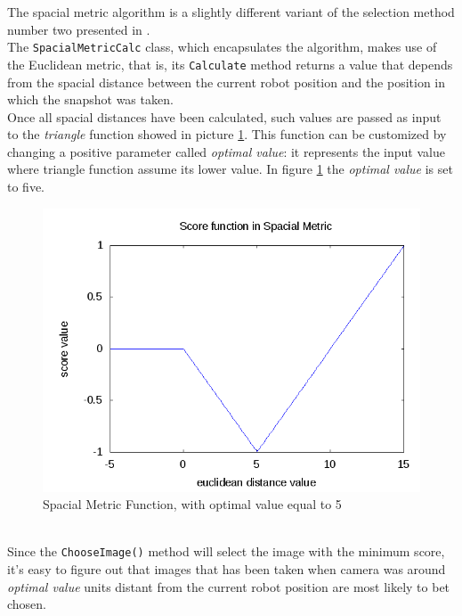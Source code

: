 The spacial metric algorithm is a slightly different variant 
of the selection method number two presented in \cite{sugimoto}.
\\
The \texttt{SpacialMetricCalc} class, which encapsulates 
the algorithm, makes use of the Euclidean metric, that is,
its \texttt{Calculate} method returns a value that 
depends from the spacial distance between the current 
robot position and the position in which the snapshot 
was taken.
\\
Once all spacial distances have been calculated, such values 
are passed as input to the \textit{triangle} function 
showed in picture \ref{fig:spacial_metric_func}. This function
can be customized by changing a positive parameter called
\textit{optimal value}: it represents the input value
where triangle function assume its lower value. In 
figure \ref{fig:spacial_metric_func} the \textit{optimal value}
is set to five.
\begin{figure}[!h]
  \begin{center}
    \includegraphics[width=400pt]{img/spacialMetricFunc.png} 
    \caption{Spacial Metric Function, with optimal value equal to 5}
    \label{fig:spacial_metric_func}
  \end{center}
\end{figure}
\\
Since the \texttt{ChooseImage()} method will select the image with 
the minimum score, it's easy to figure out that 
images that has been taken when camera was around 
\textit{optimal value} units distant from the current robot position
are most likely to bet chosen.
\\
